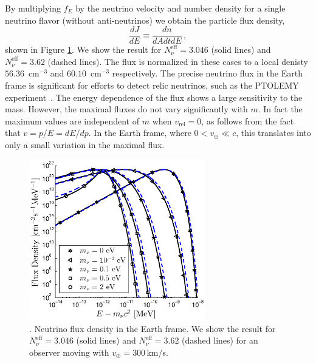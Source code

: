 By multiplying $f_E$ by the neutrino velocity and number density for a single neutrino flavor (without anti-neutrinos) we obtain the particle flux density,
 \begin{equation}
 \frac{dJ}{dE}\equiv\frac{dn}{dAdtdE}\,,
\end{equation} 
shown in Figure \ref{fig:flux_dist}. We show the result for $N_\nu^{\mathrm{eff}}=3.046$ (solid lines) and $N_\nu^{\mathrm{eff}}=3.62$ (dashed lines). The flux is normalized in these cases to a local denisty $56.36$~cm${}^{-3}$ and $60.10$~cm${}^{-3}$ respectively. The precise neutrino flux in the Earth frame is significant for efforts to detect relic neutrinos, such as the PTOLEMY experiment~\cite{PTOLEMY}. The energy dependence of the flux shows a large sensitivity to the mass. However, the maximal fluxes do not vary significantly with $m$. In fact the maximum values are independent of $m$ when $v_{\text{rel}}=0$, as follows from the fact that $v=p/E=dE/dp$.  In the Earth frame, where $0<v_\oplus\ll c$, this translates into only a small variation in the maximal flux.
\begin{figure}%
\centerline{\includegraphics[height=7cm]{04-birrell/NeutrinoDistributionToday/Figures/flux_dist.eps}}
\caption{.  Neutrino flux density in the Earth frame. We show the result for $N_\nu^{\mathrm{eff}}=3.046$ (solid lines) and $N_\nu^{\mathrm{eff}}=3.62$ (dashed lines) for an observer moving with $v_\oplus=300$\,km/s.}\label{fig:flux_dist}
 \end{figure}

